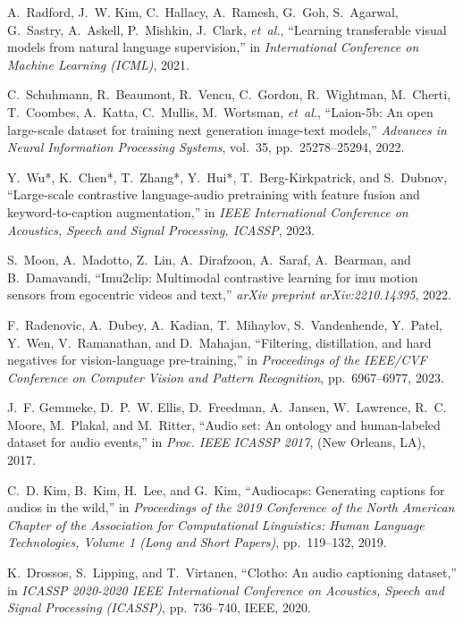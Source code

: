\begin{thebibliography}{10}
A.~Radford, J.~W. Kim, C.~Hallacy, A.~Ramesh, G.~Goh, S.~Agarwal, G.~Sastry,
  A.~Askell, P.~Mishkin, J.~Clark, {\em et~al.}, ``Learning transferable visual
  models from natural language supervision,'' in {\em International Conference
  on Machine Learning (ICML)}, 2021.

C.~Schuhmann, R.~Beaumont, R.~Vencu, C.~Gordon, R.~Wightman, M.~Cherti,
  T.~Coombes, A.~Katta, C.~Mullis, M.~Wortsman, {\em et~al.}, ``Laion-5b: An
  open large-scale dataset for training next generation image-text models,''
  {\em Advances in Neural Information Processing Systems}, vol.~35,
  pp.~25278--25294, 2022.

Y.~Wu*, K.~Chen*, T.~Zhang*, Y.~Hui*, T.~Berg-Kirkpatrick, and S.~Dubnov,
  ``Large-scale contrastive language-audio pretraining with feature fusion and
  keyword-to-caption augmentation,'' in {\em IEEE International Conference on
  Acoustics, Speech and Signal Processing, ICASSP}, 2023.

S.~Moon, A.~Madotto, Z.~Lin, A.~Dirafzoon, A.~Saraf, A.~Bearman, and
  B.~Damavandi, ``Imu2clip: Multimodal contrastive learning for imu motion
  sensors from egocentric videos and text,'' {\em arXiv preprint
  arXiv:2210.14395}, 2022.

F.~Radenovic, A.~Dubey, A.~Kadian, T.~Mihaylov, S.~Vandenhende, Y.~Patel,
  Y.~Wen, V.~Ramanathan, and D.~Mahajan, ``Filtering, distillation, and hard
  negatives for vision-language pre-training,'' in {\em Proceedings of the
  IEEE/CVF Conference on Computer Vision and Pattern Recognition},
  pp.~6967--6977, 2023.

J.~F. Gemmeke, D.~P.~W. Ellis, D.~Freedman, A.~Jansen, W.~Lawrence, R.~C.
  Moore, M.~Plakal, and M.~Ritter, ``Audio set: An ontology and human-labeled
  dataset for audio events,'' in {\em Proc. IEEE ICASSP 2017}, (New Orleans,
  LA), 2017.

C.~D. Kim, B.~Kim, H.~Lee, and G.~Kim, ``Audiocaps: Generating captions for
  audios in the wild,'' in {\em Proceedings of the 2019 Conference of the North
  American Chapter of the Association for Computational Linguistics: Human
  Language Technologies, Volume 1 (Long and Short Papers)}, pp.~119--132, 2019.

K.~Drossos, S.~Lipping, and T.~Virtanen, ``Clotho: An audio captioning
  dataset,'' in {\em ICASSP 2020-2020 IEEE International Conference on
  Acoustics, Speech and Signal Processing (ICASSP)}, pp.~736--740, IEEE, 2020.


\end{thebibliography}
